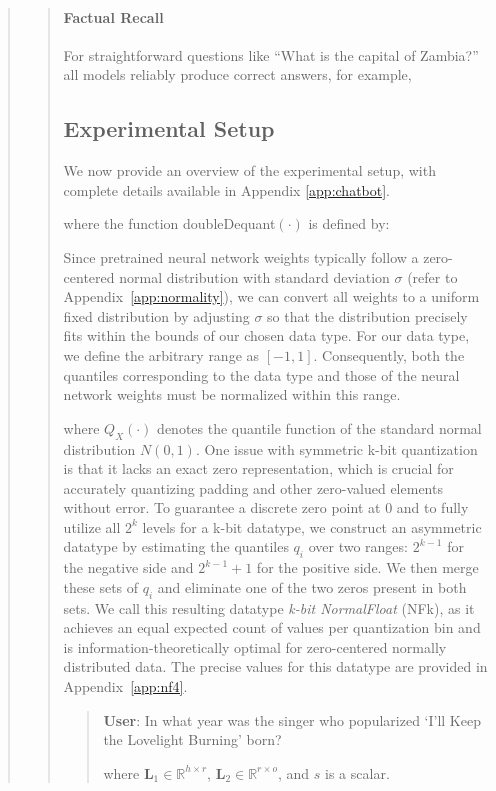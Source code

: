 \begin{quote}
\begin{quote}
\paragraph{Factual Recall} For straightforward questions like ``What is the capital of Zambia?'' all models reliably produce correct answers, for example,

\subsection{Experimental Setup} We now provide an overview of the experimental setup, with complete details available in Appendix \ref{app:chatbot}.

where the function doubleDequant$(\cdot)$ is defined by:

Since pretrained neural network weights typically follow a zero-centered normal distribution with standard deviation $\sigma$ (refer to Appendix~\ref{app:normality}), we can convert all weights to a uniform fixed distribution by adjusting $\sigma$ so that the distribution precisely fits within the bounds of our chosen data type. For our data type, we define the arbitrary range as $[-1, 1]$. Consequently, both the quantiles corresponding to the data type and those of the neural network weights must be normalized within this range.

where $Q_X(\cdot)$ denotes the quantile function of the standard normal distribution $N(0,1)$. One issue with symmetric k-bit quantization is that it lacks an exact zero representation, which is crucial for accurately quantizing padding and other zero-valued elements without error. To guarantee a discrete zero point at $0$ and to fully utilize all $2^k$ levels for a k-bit datatype, we construct an asymmetric datatype by estimating the quantiles $q_i$ over two ranges: $2^{k-1}$ for the negative side and $2^{k-1}+1$ for the positive side. We then merge these sets of $q_i$ and eliminate one of the two zeros present in both sets. We call this resulting datatype \emph{k-bit NormalFloat} (NFk), as it achieves an equal expected count of values per quantization bin and is information-theoretically optimal for zero-centered normally distributed data. The precise values for this datatype are provided in Appendix~\ref{app:nf4}.

\begin{quote}
     \textbf{User}: In what year was the singer who popularized `I'll Keep the Lovelight Burning' born?  

where $\mathbf{L}_1 \in \mathbb{R}^{h \times r}$, $\mathbf{L}_2 \in \mathbb{R}^{r \times o}$, and $s$ is a scalar.


\end{quote}
\end{quote}
\end{quote}
